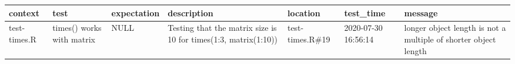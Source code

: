 \documentclass[
]{book}
\begin{document}
\begin{longtable}[]{@{}lllllll@{}}
\toprule
\begin{minipage}[b]{0.05\columnwidth}\raggedright
context\strut
\end{minipage} & \begin{minipage}[b]{0.10\columnwidth}\raggedright
test\strut
\end{minipage} & \begin{minipage}[b]{0.05\columnwidth}\raggedright
expectation\strut
\end{minipage} & \begin{minipage}[b]{0.24\columnwidth}\raggedright
description\strut
\end{minipage} & \begin{minipage}[b]{0.06\columnwidth}\raggedright
location\strut
\end{minipage} & \begin{minipage}[b]{0.08\columnwidth}\raggedright
test\_time\strut
\end{minipage} & \begin{minipage}[b]{0.24\columnwidth}\raggedright
message\strut
\end{minipage}\tabularnewline
\midrule
\endhead
\begin{minipage}[t]{0.05\columnwidth}\raggedright
test-times.R\strut
\end{minipage} & \begin{minipage}[t]{0.10\columnwidth}\raggedright
times() works with matrix\strut
\end{minipage} & \begin{minipage}[t]{0.05\columnwidth}\raggedright
NULL\strut
\end{minipage} & \begin{minipage}[t]{0.24\columnwidth}\raggedright
Testing that the matrix size is 10 for times(1:3, matrix(1:10))\strut
\end{minipage} & \begin{minipage}[t]{0.06\columnwidth}\raggedright
test-times.R\#19\strut
\end{minipage} & \begin{minipage}[t]{0.08\columnwidth}\raggedright
2020-07-30 16:56:14\strut
\end{minipage} & \begin{minipage}[t]{0.24\columnwidth}\raggedright
longer object length is not a multiple of shorter object length\strut
\end{minipage}\tabularnewline
\bottomrule
\end{longtable}
\end{document}
